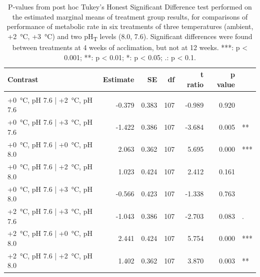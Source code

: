 \documentclass[a4paper,10pt, oneside]{memoir}
\begin{document}
\begin{table}[tb]

\caption[Comparisons of performance of metabolic rate for \textit{H. erythrogramma} acclimated to six treatments of three temperatures and two pH\textsubscript{T} levels.]{\label{mrcontraststab}P-values from post hoc Tukey's Honest Significant Difference test performed on the estimated marginal means of treatment group results, for comparisons of performance of metabolic rate in six treatments of three temperatures (ambient, +\SI{2}{\celsius}, +\SI{3}{\celsius}) and two pH\textsubscript{T} levels (8.0, 7.6). Significant differences were found between treatments at 4 weeks of acclimation, but not at 12 weeks. ***: p \textless{} 0.001; **: p \textless{} 0.01; *: p
\textless{} 0.05; .: p \textless{} 0.1.}
\centering
\begin{tabular}[t]{lrrrrrl}
\toprule
Contrast & Estimate & SE & df & t ratio & p value & \\
\midrule
\addlinespace[0.3em]
\multicolumn{7}{l}{\textit{4 weeks}}\\
\hspace{1em}+\SI{0}{\celsius}, pH 7.6 | +\SI{2}{\celsius}, pH 7.6 & -0.379 & 0.383 & 107 & -0.989 & 0.920 & \\
\hspace{1em}+\SI{0}{\celsius}, pH 7.6 | +\SI{3}{\celsius}, pH 7.6 & -1.422 & 0.386 & 107 & -3.684 & 0.005 & **\\
\hspace{1em}+\SI{0}{\celsius}, pH 7.6 | +\SI{0}{\celsius}, pH 8.0 & 2.063 & 0.362 & 107 & 5.695 & 0.000 & ***\\
\hspace{1em}+\SI{0}{\celsius}, pH 7.6 | +\SI{2}{\celsius}, pH 8.0 & 1.023 & 0.424 & 107 & 2.412 & 0.161 & \\
\hspace{1em}+\SI{0}{\celsius}, pH 7.6 | +\SI{3}{\celsius}, pH 8.0 & -0.566 & 0.423 & 107 & -1.338 & 0.763 & \\
\hspace{1em}+\SI{2}{\celsius}, pH 7.6 | +\SI{3}{\celsius}, pH 7.6 & -1.043 & 0.386 & 107 & -2.703 & 0.083 & .\\
\hspace{1em}+\SI{2}{\celsius}, pH 7.6 | +\SI{0}{\celsius}, pH 8.0 & 2.441 & 0.424 & 107 & 5.754 & 0.000 & ***\\
\hspace{1em}+\SI{2}{\celsius}, pH 7.6 | +\SI{2}{\celsius}, pH 8.0 & 1.402 & 0.362 & 107 & 3.870 & 0.003 & **\\

\end{tabular}
\end{table}
\end{document}
